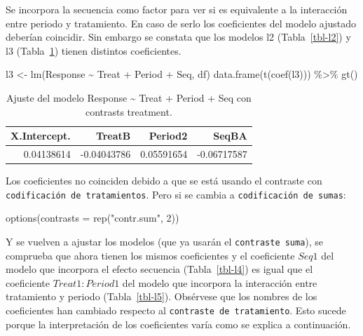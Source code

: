 \documentclass[
  12pt,
  a4paper,
  extrafontsizes,
  onecolumn,
  openright,
  table]{memoir}
\newenvironment{Shaded}{\begin{snugshade}}{\end{snugshade}}
\newcommand{\AttributeTok}[1]{\textcolor[rgb]{0.40,0.45,0.13}{#1}}
\newcommand{\DecValTok}[1]{\textcolor[rgb]{0.68,0.00,0.00}{#1}}
\newcommand{\FunctionTok}[1]{\textcolor[rgb]{0.28,0.35,0.67}{#1}}
\newcommand{\NormalTok}[1]{\textcolor[rgb]{0.00,0.23,0.31}{#1}}
\newcommand{\OtherTok}[1]{\textcolor[rgb]{0.00,0.23,0.31}{#1}}
\newcommand{\SpecialCharTok}[1]{\textcolor[rgb]{0.37,0.37,0.37}{#1}}
\newcommand{\StringTok}[1]{\textcolor[rgb]{0.13,0.47,0.30}{#1}}
\begin{document}
Se incorpora la secuencia como factor para ver si es equivalente a la
interacción entre periodo y tratamiento. En caso de serlo los
coeficientes del modelo ajustado deberían coincidir. Sin embargo se
constata que los modelos l2 (Tabla~\ref{tbl-l2}) y l3
(Tabla~\ref{tbl-l3}) tienen distintos coeficientes.

\scriptsize

\begin{Shaded}
\begin{Highlighting}[]
\NormalTok{l3 }\OtherTok{\textless{}{-}} \FunctionTok{lm}\NormalTok{(Response }\SpecialCharTok{\textasciitilde{}}\NormalTok{ Treat }\SpecialCharTok{+}\NormalTok{ Period }\SpecialCharTok{+}\NormalTok{ Seq, df)}
\FunctionTok{data.frame}\NormalTok{(}\FunctionTok{t}\NormalTok{(}\FunctionTok{coef}\NormalTok{(l3))) }\SpecialCharTok{\%\textgreater{}\%} \FunctionTok{gt}\NormalTok{()}
\end{Highlighting}
\end{Shaded}

\hypertarget{tbl-l3}{}
\begin{longtable}{rrrr}
\caption{\label{tbl-l3}Ajuste del modelo Response \textasciitilde{} Treat + Period + Seq con
contrasts treatment. }\tabularnewline

\toprule
X.Intercept. & TreatB & Period2 & SeqBA \\ 
\midrule
0.04138614 & -0.04043786 & 0.05591654 & -0.06717587 \\ 
\bottomrule
\end{longtable}

\normalsize

Los coeficientes no coinciden debido a que se está usando el contraste
con \texttt{codificación\ de\ tratamientos}. Pero si se cambia a
\texttt{codificación\ de\ sumas}:

\scriptsize

\begin{Shaded}
\begin{Highlighting}[]
\FunctionTok{options}\NormalTok{(}\AttributeTok{contrasts =} \FunctionTok{rep}\NormalTok{(}\StringTok{"contr.sum"}\NormalTok{, }\DecValTok{2}\NormalTok{))}
\end{Highlighting}
\end{Shaded}

\normalsize

Y se vuelven a ajustar los modelos (que ya usarán el
\texttt{contraste\ suma}), se comprueba que ahora tienen los mismos
coeficientes y el coeficiente \(Seq1\) del modelo que incorpora el
efecto secuencia (Tabla~\ref{tbl-l4}) es igual que el coeficiente
\(Treat1:Period1\) del modelo que incorpora la interacción entre
tratamiento y periodo (Tabla~\ref{tbl-l5}). Obsérvese que los nombres de
los coeficientes han cambiado respecto al
\texttt{contraste\ de\ tratamiento}. Esto sucede porque la
interpretación de los coeficientes varía como se explica a continuación.
\end{document}
